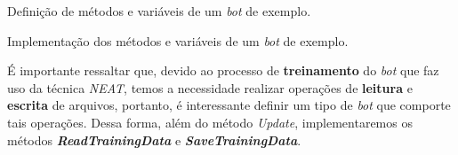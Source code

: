 \begin{algorithm}[H]

\caption[Definição de métodos e variáveis de um \textit{bot} de exemplo.]
{\label{alg:project-example-bot-header}Definição de métodos e variáveis de um
\textit{bot} de exemplo.}
\end{algorithm}

\begin{algorithm}[H]

\caption[Implementação dos métodos e variáveis de um \textit{bot} de exemplo.]
{\label{alg:project-example-bot-impl}Implementação dos métodos e variáveis de um
\textit{bot} de exemplo.}
\end{algorithm}

É importante ressaltar que, devido ao processo de \textbf{treinamento} do
\textit{bot} que faz uso da técnica \textit{NEAT}, temos a necessidade realizar
operações de \textbf{leitura} e \textbf{escrita} de arquivos, portanto, é
interessante definir um tipo de \textit{bot} que comporte tais operações. Dessa
forma, além do método \textit{Update}, implementaremos os métodos
\textbf{\textit{ReadTrainingData}} e \textbf{\textit{SaveTrainingData}}.

